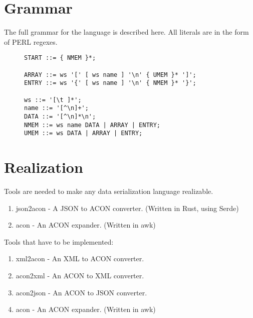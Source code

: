 \documentclass[listof=totoc]{article}
\begin{document}
\section{Grammar}
\noindent The full grammar for the language is described here. All literals are in the form of PERL regexes.


\begin{figure}[H]
\centering
\begin{varwidth}{\linewidth}
\begin{verbatim}
START ::= { NMEM }*;

ARRAY ::= ws '[' [ ws name ] '\n' { UMEM }* ']';
ENTRY ::= ws '{' [ ws name ] '\n' { NMEM }* '}';

ws ::= '[\t ]*';
name ::= '[^\n]+';
DATA ::= '[^\n]*\n';
NMEM ::= ws name DATA | ARRAY | ENTRY;
UMEM ::= ws DATA | ARRAY | ENTRY;

\end{verbatim}
\end{varwidth}
\caption{}
\end{figure}

\section{Realization}
\noindent Tools are needed to make any data serialization language realizable.

\begin{enumerate}
  \item json2acon - A JSON to ACON converter. (Written in Rust, using Serde)
  \item acon - An ACON expander. (Written in awk)
\end{enumerate}

\noindent Tools that have to be implemented:
\begin{enumerate}
  \item xml2acon - An XML to ACON converter.
  \item acon2xml - An ACON to XML converter.
  \item acon2json - An ACON to JSON converter.
  \item acon - An ACON expander. (Written in awk)
\end{enumerate}


\lstlistoflistings



\end{document}

